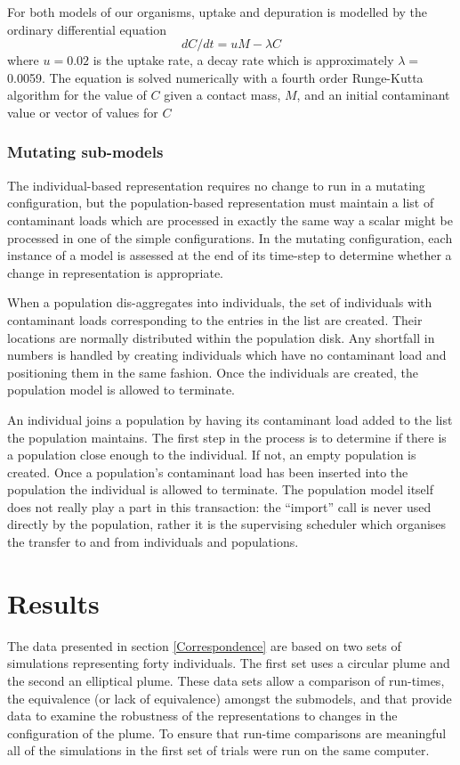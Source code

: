 For both models of our organisms, uptake and depuration is modelled by the
ordinary differential equation
\[ d C / d t = u M - \lambda C \]
where $u = 0.02$ is the uptake rate, a decay rate which is approximately
$\lambda =$0.0059. The equation is solved numerically with a fourth order
Runge-Kutta algorithm for the value of $C$ given a contact mass, $M$, and an
initial contaminant value or vector of values for $C$

\subsubsection{Mutating sub-models}

The individual-based representation requires no change to run in a mutating
configuration, but the population-based representation must maintain a list of
contaminant loads which are processed in exactly the same way a scalar might
be processed in one of the simple configurations. In the mutating
configuration, each instance of a model is assessed at the end of its time-step
to determine whether a change in representation is appropriate.

When a population dis-aggregates into individuals, the set of individuals with
contaminant loads corresponding to the entries in the list are created. Their
locations are normally distributed within the population disk. Any shortfall
in numbers is handled by creating individuals which have no contaminant load
and positioning them in the same fashion. Once the individuals are created,
the population model is allowed to terminate.

An individual joins a population by having its contaminant load added to the
list the population maintains. The first step in the process is to determine
if there is a population close enough to the individual. If not, an empty
population is created. Once a population's contaminant load has been inserted
into the population the individual is allowed to terminate. The population
model itself does not really play a part in this transaction: the ``import''
call is never used directly by the population, rather it is the supervising
scheduler which organises the transfer to and from individuals and
populations.

\section{Results}\label{Results}

The data presented in section \ref{Correspondence} are based on two sets of
simulations representing forty individuals. The first set uses a circular
plume and the second an elliptical plume. These data sets allow a comparison
of run-times, the equivalence (or lack of equivalence) amongst the submodels,
and that provide data to examine the robustness of the representations to
changes in the configuration of the plume. To ensure that run-time comparisons
are meaningful all of the simulations in the first set of trials were run on
the same computer.

